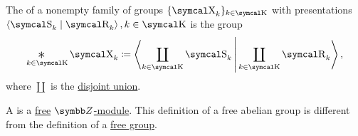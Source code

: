 \begin{definition}\label{def:group_free_product}
  The  of a nonempty family of groups \( \{ \CX_k \}_{k \in \CK} \) with presentations \( \Gen{\CS_k \mid \CR_k}, k \in \CK \) is the group
  \begin{equation*}
    \Ast_{k \in \CK} \CX_k \coloneqq \Gen{ \coprod_{k \in \CK} \CS_k | \coprod_{k \in \CK} \CR_k },
  \end{equation*}
  where \( \coprod \) is the \hyperref[def:disjoint_union]{disjoint union}.
\end{definition}

\begin{definition}\label{def:free_abelian_group}
  A  is a \hyperref[def:free_left_module]{free} \hyperref[thm:abelian_group_iff_z_module]{\( \BZ \)-module}. This definition of a free abelian group is different from the definition of a \hyperref[def:free_group]{free group}.
\end{definition}

